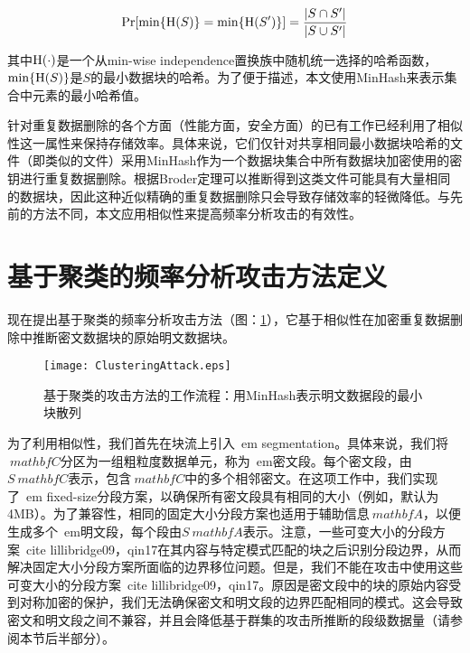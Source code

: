 \begin{eqnarray}
	\Pr[\min\{{\rm H}(S)\} = \min\{{\rm H}(S')\} ] = \frac{|S \cap S'|}{|S \cup S'|}
	\label{eq:similary}
\end{eqnarray}

其中${\rm H}(\cdot)$是一个从min-wise independence置换族中随机统一选择的哈希函数，$\min\{{\rm H}(S)\}$是$S$的最小数据块的哈希。为了便于描述，本文使用MinHash来表示集合中元素的最小哈希值。


针对重复数据删除的各个方面（性能方面\cite{qin2017design,xia2011silo,bhagwat2009extreme}，安全方面\cite{li2017information}）的已有工作已经利用了相似性这一属性来保持存储效率。具体来说，它们仅针对共享相同最小数据块哈希的文件（即类似的文件）采用MinHash作为一个数据块集合中所有数据块加密使用的密钥进行重复数据删除。根据Broder定理可以推断得到这类文件可能具有大量相同的数据块，因此这种近似精确的重复数据删除只会导致存储效率的轻微降低。与先前的方法不同\cite{qin2017design,xia2011silo,bhagwat2009extreme,li2017information}，本文应用相似性来提高频率分析攻击的有效性。
 
\section{基于聚类的频率分析攻击方法定义}
\label{sec:clustering-attack-description}

现在提出基于聚类的频率分析攻击方法（图：\ref{fig:基于聚类的攻击方法的工作流程}），它基于相似性在加密重复数据删除中推断密文数据块的原始明文数据块。

\begin{figure}[!htb]
    \small
    \centering
    \texttt{[image: ClusteringAttack.eps]}
    \caption{基于聚类的攻击方法的工作流程：用MinHash表示明文数据段的最小块散列} 
    \label{fig:基于聚类的攻击方法的工作流程}
\end{figure}

为了利用相似性，我们首先在块流上引入{\ em segmentation}。具体来说，我们将$ \ mathbf {C} $分区为一组粗粒度数据单元，称为{\ em密文段}。每个密文段，由$ S_ \ mathbf {C} $表示，包含$ \ mathbf {C} $中的多个相邻密文。在这项工作中，我们实现了{\ em fixed-size}分段方案，以确保所有密文段具有相同的大小（例如，默认为4MB）。为了兼容性，相同的固定大小分段方案也适用于辅助信息$ \ mathbf {A} $，以便生成多个{\ em明文段}，每个段由$ S_ \ mathbf {A} $表示。注意，一些可变大小的分段方案\ cite {lillibridge09，qin17}在其内容与特定模式匹配的块之后识别分段边界，从而解决固定大小分段方案所面临的边界移位问题。但是，我们不能在攻击中使用这些可变大小的分段方案\ cite {lillibridge09，qin17}。原因是密文段中的块的原始内容受到对称加密的保护，我们无法确保密文和明文段的边界匹配相同的模式。这会导致密文和明文段之间不兼容，并且会降低基于群集的攻击所推断的段级数据量（请参阅本节后半部分）。

